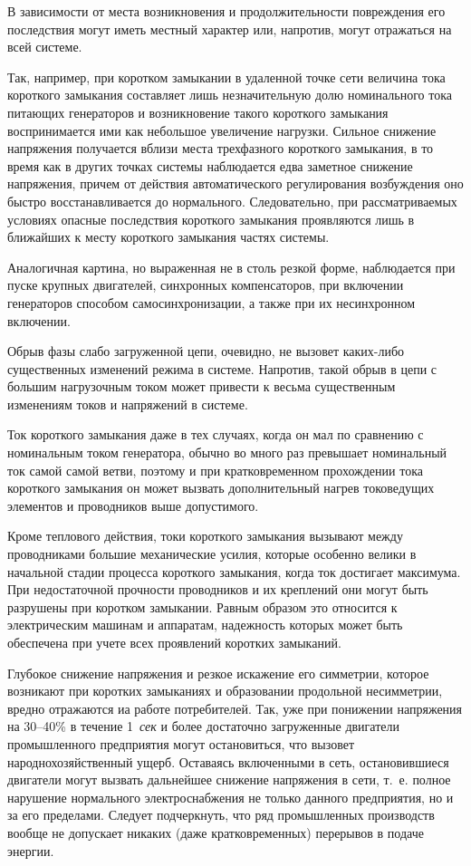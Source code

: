 В зависимости от места возникновения и продолжительности повреждения его последствия могут иметь местный характер или, напротив, могут отражаться на всей системе.

Так, например, при коротком замыкании в удаленной точке сети величина тока короткого замыкания составляет лишь незначительную долю номинального тока питающих генераторов и возникновение такого короткого замыкания воспринимается ими как небольшое увеличение нагрузки. Сильное снижение напряжения получается вблизи места трехфазного короткого замыкания, в то время как в других точках системы наблюдается едва заметное снижение напряжения, причем от действия автоматического регулирования возбуждения оно быстро восстанавливается до нормального. Следовательно, при рассматриваемых условиях опасные последствия короткого замыкания проявляются лишь в ближайших к месту короткого замыкания частях системы.

Аналогичная картина, но выраженная не в столь резкой форме, наблюдается при пуске крупных двигателей, синхронных компенсаторов, при включении генераторов способом самосинхронизации, а также при их несинхронном включении.

Обрыв фазы слабо загруженной цепи, очевидно, не вызовет каких-либо существенных изменений режима в системе. Напротив, такой обрыв в цепи с большим нагрузочным током может привести к весьма существенным изменениям токов и напряжений в системе.

Ток короткого замыкания даже в тех случаях, когда он мал по сравнению с номинальным током генератора, обычно во много раз превышает номинальный ток самой самой ветви, поэтому и при кратковременном прохождении тока короткого замыкания он может вызвать дополнительный нагрев токоведущих элементов и проводников выше допустимого.

Кроме теплового действия, токи короткого замыкания вызывают между проводниками большие механические усилия, которые особенно велики в начальной стадии процесса короткого замыкания, когда ток достигает максимума. При недостаточной прочности проводников и их креплений они могут быть разрушены при коротком замыкании. Равным образом это относится к электрическим машинам и аппаратам, надежность которых может быть обеспечена при учете всех проявлений коротких замыканий.

Глубокое снижение напряжения и резкое искажение его симметрии, которое возникают при коротких замыканиях и образовании продольной несимметрии, вредно отражаются иа работе потребителей. Так, уже при понижении напряжения на 30--40\% в течение 1~\textit{сек} и более достаточно загруженные двигатели промышленного предприятия могут остановиться, что вызовет народнохозяйственный ущерб. Оставаясь включенными в сеть, остановившиеся двигатели могут вызвать дальнейшее снижение напряжения в сети, т.~е. полное нарушение нормального электроснабжения не только данного предприятия, но и за его пределами. Следует подчеркнуть, что ряд промышленных производств вообще не допускает никаких (даже кратковременных) перерывов в подаче энергии.


